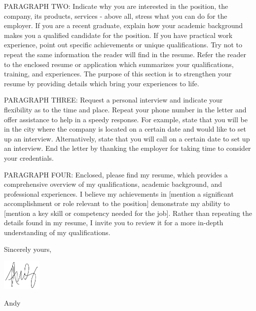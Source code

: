 \documentclass[11pt]{article}
\begin{document}
PARAGRAPH TWO: Indicate why you are interested in the position, the company, its products, services - above all, stress what you can do for the employer. If you are a recent graduate, explain how your academic background makes you a qualified candidate for the position. If you have practical work experience, point out specific achievements or unique qualifications. Try not to repeat the same information the reader will find in the resume. Refer the reader to the enclosed resume or application which summarizes your qualifications, training, and experiences. The purpose of this section is to strengthen your resume by providing details which bring your experiences to life.

PARAGRAPH THREE: Request a personal interview and indicate your flexibility as to the time and place. Repeat your phone number in the letter and offer assistance to help in a speedy response. For example, state that you will be in the city where the company is located on a certain date and would like to set up an interview. Alternatively, state that you will call on a certain date to set up an interview. End the letter by thanking the employer for taking time to consider your credentials.

PARAGRAPH FOUR: Enclosed, please find my resume, which provides a comprehensive overview of my qualifications, academic background, and professional experiences. I believe my achievements in [mention a significant accomplishment or role relevant to the position] demonstrate my ability to [mention a key skill or competency needed for the job]. Rather than repeating the details found in my resume, I invite you to review it for a more in-depth understanding of my qualifications.

\bigskip

Sincerely yours,

\includegraphics[height=1.5cm]{signature}


Andy
\end{document}
